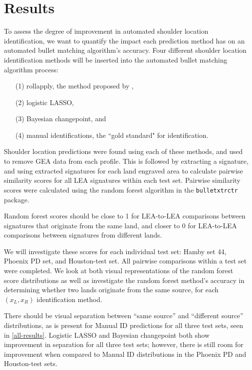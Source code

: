 \documentclass[12pt]{article}
\begin{document}
\section{Results}

To assess the degree of improvement in automated shoulder location
identification, we want to quantify the impact each prediction method
has on an automated bullet matching algorithm's accuracy. Four different
shoulder location identification methods will be inserted into the
automated bullet matching algorithm process:

\begin{itemize}
\item[(1)] rollapply, the method proposed by \cite{Hare1}, 
\item[(2)] logistic LASSO,
\item[(3)] Bayesian changepoint, and
\item[(4)] manual identifications, the ``gold standard" for identification.  
\end{itemize}

Shoulder location predictions were found using each of these methods,
and used to remove GEA data from each profile. This is followed by
extracting a signature, and using extracted signatures for each land
engraved area to calculate pairwise similarity scores for all LEA
signatures within each test set. Pairwise similarity scores were
calculated using the random forest algorithm in the
\texttt{bulletxtrctr} package.

Random forest scores should be close to 1 for LEA-to-LEA comparisons
between signatures that originate from the same land, and closer to 0
for LEA-to-LEA comparisons between signatures from different lands.

We will investigate these scores for each individual test set: Hamby set
44, Phoenix PD set, and Houston-test set. All pairwise comparisons
within a test set were completed. We look at both visual representations
of the random forest score distributions as well as investigate the
random forest method's accuracy in determining whether two lands
originate from the same source, for each \((x_L, x_R)\) identification
method.

There should be visual separation between ``same source'' and
``different source'' distributions, as is present for Manual ID
predictions for all three test sets, seen in \autoref{all-results}.
Logistic LASSO and Bayesian changepoint both show improvement in
separation for all three test sets; however, there is still room for
improvement when compared to Manual ID distributions in the Phoenix PD
and Houston-test sets.
\end{document}
